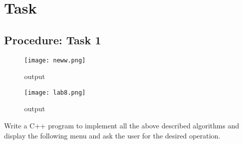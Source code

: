 \documentclass[11pt]{article}            %
\begin{document}
\section{Task}  
\subsection{Procedure: Task 1 }     

\begin{figure*}
\centering
  \texttt{[image: neww.png]}
  \caption{output}
    \texttt{[image: lab8.png]}
\caption{output}
\label{Figure:3}    
\end{figure*}
Write a C++ program to implement all the above described algorithms and display the following menu and ask the user for the desired operation.

\subsection{ }     
\end{document}
